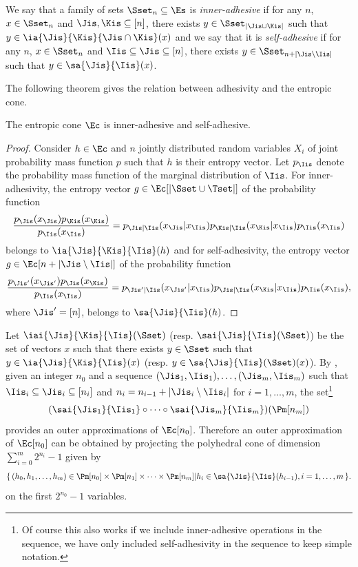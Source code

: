 \documentclass[12pt]{article}
\begin{document}
\begin{mydef}
  We say that a family of sets $\Sset_n \subseteq \Es$ is \emph{inner-adhesive} if for any $n$, $x \in \Sset_n$ and $\Jis, \Kis \subseteq [n]$,
  there exists $y \in \Sset_{|\Jis\cup\Kis|}$ such that $y \in \ia{\Jis}{\Kis}{\Jis\cap\Kis}(x)$ and
  we say that it is \emph{self-adhesive} if for any $n$, $x \in \Sset_n$ and $\Iis \subseteq \Jis \subseteq [n]$,
  there exists $y \in \Sset_{n + |\Jis \setminus \Iis|}$ such that $y \in \sa{\Jis}{\Iis}(x)$.
\end{mydef}

The following theorem gives the relation between adhesivity and the entropic cone.
\begin{mytheo}
  \label{theo:adh}
  The entropic cone $\Ec$ is inner-adhesive and self-adhesive.
  \begin{proof}
    Consider $h \in \Ec$ and $n$ jointly distributed random variables $X_i$ of joint probability mass function $p$ such that $h$ is their entropy vector.
    Let $p_{\Iis}$ denote the probability mass function of the marginal distribution of $\Iis$.
    For inner-adhesivity, the entropy vector $g \in \Ec[|\Sset\cup\Tset|]$ of the probability function
    \[ \frac{p_{\Jis}(x_{\Jis})p_{\Kis}(x_{\Kis})}{p_{\Iis}(x_{\Iis})} = p_{\Jis|\Iis}(x_{\Jis}|x_{\Iis})p_{\Kis|\Iis}(x_{\Kis}|x_{\Iis})p_{\Iis}(x_{\Iis}) \]
    belongs to $\ia{\Jis}{\Kis}{\Iis}(h)$ and
    for self-adhesivity, the entropy vector $g \in \Ec[n + |\Jis \setminus \Iis|]$ of the probability function
    \[ \frac{p_{\Jis'}(x_{\Jis'})p_{\Jis}(x_{\Kis})}{p_{\Iis}(x_{\Iis})} = p_{\Jis'|\Iis}(x_{\Jis'}|x_{\Iis})p_{\Jis|\Iis}(x_{\Kis}|x_{\Iis})p_{\Iis}(x_{\Iis}), \]
    where $\Jis' = [n]$, belongs to $\sa{\Jis}{\Iis}(h)$.
  \end{proof}
\end{mytheo}

Let $\iai{\Jis}{\Kis}{\Iis}(\Sset)$ (resp. $\sai{\Jis}{\Iis}(\Sset)$) be the set of vectors $x$ such that there exists $y \in \Sset$ such that $y \in \ia{\Jis}{\Kis}{\Iis}(x)$ (resp. $y \in \sa{\Jis}{\Iis}(\Sset)(x)$).
By ,
given an integer $n_0$ and a sequence $(\Jis_1, \Iis_1), \ldots, (\Jis_m, \Iis_m)$ such that $\Iis_i \subseteq \Jis_i \subseteq [n_i]$ and $n_i = n_{i-1} + |\Jis_i \setminus \Iis_i|$ for $i = 1, \ldots, m$,
the set\footnote{Of course this also works if we include inner-adhesive operations in the sequence,
we have only included self-adhesivity in the sequence to keep simple notation.}
\[ (\sai{\Jis_1}{\Iis_1} \circ \cdots \circ \sai{\Jis_m}{\Iis_m})(\Pm[n_m]) \]
provides an outer approximations of $\Ec[n_0]$.
Therefore an outer approximation of $\Ec[n_0]$ can be obtained by projecting the polyhedral cone of dimension $\sum_{i=0}^m 2^{n_i}-1$ given by
\begin{equation}
  \label{eq:bigpoly}
  \{\, (h_0, h_1, \ldots, h_m) \in \Pm[n_0] \times \Pm[n_1] \times \cdots \times \Pm[n_m] | h_i \in \sa{\Jis}{\Iis}(h_{i-1}), i = 1, \ldots, m \,\}.
\end{equation}
on the first $2^{n_0}-1$ variables.
\end{document}
